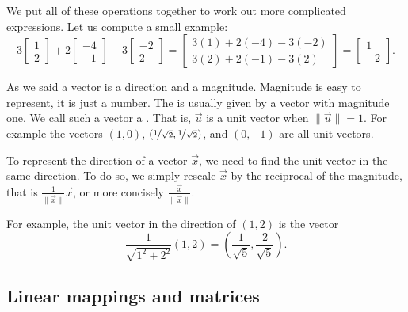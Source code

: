We put all of these operations together to work out more complicated expressions.
Let us compute a small example:
\begin{equation*}
3
\begin{bmatrix}
1 \\ 2
\end{bmatrix}
+
2
\begin{bmatrix}
-4 \\ -1
\end{bmatrix} 
-
3
\begin{bmatrix}
-2 \\ 2
\end{bmatrix} 
=
\begin{bmatrix}
3(1)+2(-4)-3(-2) \\ 3(2)+2(-1)-3(2)
\end{bmatrix}
=
\begin{bmatrix}
1 \\ -2
\end{bmatrix}
.
\end{equation*}

\medskip

As we said a vector is a direction and a magnitude.  Magnitude is easy to
represent, it is just a number.  The \emph{} is usually
given by a vector with magnitude one.  We call such a vector a
\emph{}.  That is, $\vec{u}$ is a unit vector when
$\lVert \vec{u} \rVert = 1$.  For example the vectors $(1,0)$,
$(\nicefrac{1}{\sqrt{2}},\nicefrac{1}{\sqrt{2}})$, and $(0,-1)$ are all
unit vectors.

To represent the direction of a vector $\vec{x}$, we need to find the 
unit vector in the same direction.  To do so, we simply rescale
$\vec{x}$ by the reciprocal of the magnitude, that is
$\frac{1}{\lVert \vec{x} \rVert} \vec{x}$, or more concisely
$\frac{\vec{x}}{\lVert \vec{x} \rVert}$.

For example, the unit vector in the direction of $(1,2)$ is the vector
\begin{equation*}
\frac{1}{\sqrt{1^2+2^2}} (1,2)
=
\left( \frac{1}{\sqrt{5}}, \frac{2}{\sqrt{5}} \right) .
\end{equation*}

\subsection{Linear mappings and matrices}

